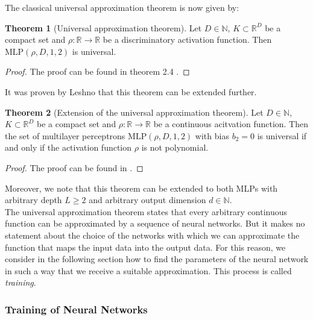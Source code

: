 \documentclass[11pt,titlepage]{article}
\newcommand{\R}{\mathbb{R}} %
\newcommand{\N}{\mathbb{N}} %
\theoremstyle{definition}
\newtheorem{theorem}{Theorem}[section]
\theoremstyle{remark}
\begin{document}
	The classical universal approximation theorem is now given by:
	
	\begin{theorem}[Universal approximation theorem]
		Let $D\in\N$, $K\subset\R^D$ be a compact set and $\rho:\R\to\R$ be a 
		discriminatory activation function. Then $\mathrm{MLP}(\rho, D, 1, 2)$ is universal.
	\end{theorem}
	
	\begin{proof}
		The proof can be found in theorem 2.4 \cite{Petersen2022}.
	\end{proof}

	It was proven by Leshno \cite{Leshno1992} that this theorem can be extended further.
	
	\begin{theorem}[Extension of the universal approximation theorem]
		Let $D\in\N$, $K\subset\R^D$ be a compact set and $\rho:\R\to\R$ be a continuous 
		acitvation function. Then the set of multilayer perceptrons $\mathrm{MLP}(\rho, D, 1, 2)$ with bias $b_2 = 0$ is universal if and only if the activation function $\rho$ 
		is not polynomial.
	\end{theorem}
	
	\begin{proof}
		The proof can be found in \cite{Leshno1992}.
	\end{proof}

	Moreover, we note that this theorem can be extended to both MLPs with arbitrary depth 
	$L\geq 2$ and arbitrary output dimension $d\in\N$. \\
	The universal approximation theorem states that every arbitrary continuous function can be approximated by a sequence of neural networks. But it makes no statement about the choice of the networks with which we can approximate the function that maps the input data into the output data. For this reason, we consider in the following section how to find the parameters of the neural network in such a way that we receive a suitable approximation. This process is called \textsl{training}.

	\subsubsection{Training of Neural Networks}\label{subsec training NNs}
	
\end{document}
